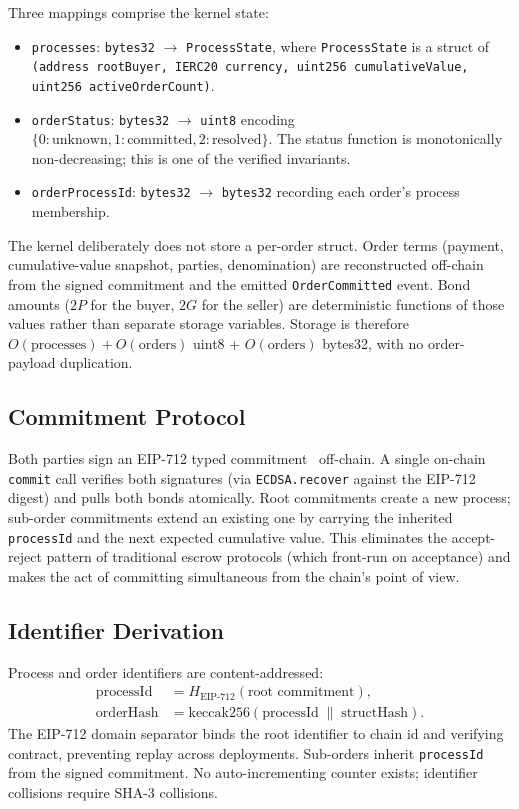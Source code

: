 \documentclass[11pt,a4paper]{article}
\theoremstyle{definition}
\theoremstyle{remark}
\newcommand{\pay}{P}
\newcommand{\cumval}{G}
\begin{document}
Three mappings comprise the kernel state:
\begin{itemize}
  \item \texttt{processes}: \texttt{bytes32} $\to$
    \texttt{ProcessState}, where \texttt{ProcessState} is a struct of
    \texttt{(address rootBuyer, IERC20 currency, uint256
    cumulativeValue, uint256 activeOrderCount)}.
  \item \texttt{orderStatus}: \texttt{bytes32} $\to$ \texttt{uint8}
    encoding $\{0:\text{unknown}, 1:\text{committed},
    2:\text{resolved}\}$. The status function is monotonically
    non-decreasing; this is one of the verified invariants.
  \item \texttt{orderProcessId}: \texttt{bytes32} $\to$
    \texttt{bytes32} recording each order's process membership.
\end{itemize}

The kernel deliberately does not store a per-order struct. Order
terms (payment, cumulative-value snapshot, parties, denomination) are
reconstructed off-chain from the signed commitment and the emitted
\texttt{OrderCommitted} event. Bond amounts ($2\pay$ for the buyer,
$2\cumval$ for the seller) are deterministic functions of those
values rather than separate storage variables. Storage is therefore
$O(\text{processes}) + O(\text{orders})$ uint8 + $O(\text{orders})$
bytes32, with no order-payload duplication.

\subsection{Commitment Protocol}

Both parties sign an EIP-712 typed commitment~\citep{eip712}
off-chain. A single on-chain \texttt{commit} call verifies both
signatures (via \texttt{ECDSA.recover} against the EIP-712 digest)
and pulls both bonds atomically. Root commitments create a new
process; sub-order commitments extend an existing one by carrying
the inherited \texttt{processId} and the next expected cumulative
value. This eliminates the accept-reject pattern of traditional
escrow protocols (which front-run on acceptance) and makes the act
of committing simultaneous from the chain's point of view.

\subsection{Identifier Derivation}

Process and order identifiers are content-addressed:
\begin{align}
  \text{processId} &= H_{\text{EIP-712}}(\text{root commitment}), \\
  \text{orderHash} &= \mathrm{keccak256}(\text{processId} \;\|\; \text{structHash}).
\end{align}
The EIP-712 domain separator binds the root identifier to chain id
and verifying contract, preventing replay across deployments. Sub-orders
inherit \texttt{processId} from the signed commitment. No
auto-incrementing counter exists; identifier collisions require
SHA-3 collisions.
\end{document}
